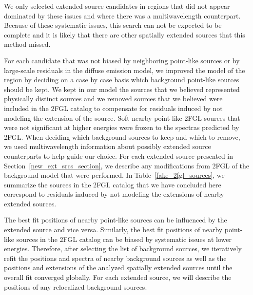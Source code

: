 \documentclass[12pt,preprint]{aastex}
\begin{document}
We only selected extended source
candidates in regions that did not appear dominated by these issues and
where there was a multiwavelength
counterpart. Because of these systematic issues, this search can not be
expected to be complete and it is likely that there are other spatially
extended sources that this method missed.

For each candidate that was not biased by neighboring point-like
sources or by large-scale residuals in the diffuse emission model, we
improved the model of the region by deciding on a case by case basis which
background point-like sources should be kept.  We kept in our model the
sources that we
believed represented physically distinct sources and we removed 
sources that we believed were included in the 2FGL catalog to compensate
for residuals induced by not modeling the extension of the source.
Soft nearby point-like 2FGL sources that were not significant at higher energies
were frozen to the spectras predicted by 2FGL.
When deciding
which background sources to keep and which to remove, we used 
multiwavelength information about possibly extended source counterparts
to help guide our choice. For each extended source presented in 
Section~\ref{new_ext_srcs_section}, we describe any modifications from 2FGL
of the background model that were performed.
In Table~\ref{fake_2fgl_sources}, we summarize the sources in
the 2FGL catalog that we have concluded here correspond to residuals
induced by not modeling the extensions of nearby extended sources.

The best fit positions of nearby point-like sources can be influenced by
the extended source and vice versa.  Similarly,
the best fit positions of nearby point-like sources in the 2FGL catalog can be biased
by systematic issues at lower energies.
Therefore, after selecting the list of background sources, we iteratively
refit the positions and spectra of nearby background sources as well as
the positions and extensions of the analyzed spatially extended
sources until the overall fit converged globally.  For each extended
source, we will describe the positions of any relocalized background
sources.
\end{document}

